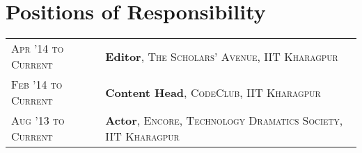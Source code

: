 \documentclass[a4paper,10pt]{extarticle} %
\begin{document}

\section{Positions of Responsibility}

\begin{tabular}{R{3.0cm}|p{15.0cm}}
\textsc{Apr '14 to Current} & \textbf{Editor}, \textsc{The Scholars' Avenue, IIT Kharagpur}\\
\textsc{Feb '14 to Current} & \textbf{Content Head}, \textsc{CodeClub, IIT Kharagpur} \\
\textsc{Aug '13 to Current} & \textbf{Actor}, \textsc{Encore, Technology Dramatics Society, IIT Kharagpur} \\
\end{tabular}


\end{document}
